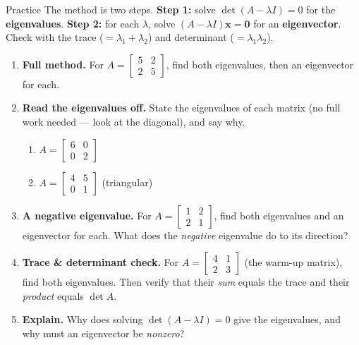 \documentclass[10pt]{article}
\newcommand{\xx}{\mathbf{x}}
\newcommand{\zero}{\mathbf{0}}
\begin{document}
\namedateperiod

\vspace{0.12in}

\begin{notesbox}{Practice}
The method is two steps. \textbf{Step 1:} solve $\det(A-\lambda I)=0$ for the \textbf{eigenvalues}.
\textbf{Step 2:} for each $\lambda$, solve $(A-\lambda I)\xx=\zero$ for an \textbf{eigenvector}. Check
with the trace ($=\lambda_1+\lambda_2$) and determinant ($=\lambda_1\lambda_2$).

\begin{enumerate}[leftmargin=1.9em, itemsep=12pt]
  \item \textbf{Full method.} For $A=\begin{bmatrix} 5 & 2 \\ 2 & 5 \end{bmatrix}$, find both
        eigenvalues, then an eigenvector for each. 
  \item \textbf{Read the eigenvalues off.} State the eigenvalues of each matrix (no full work needed ---
        look at the diagonal), and say why.
    \begin{enumerate}[label=(\alph*), leftmargin=1.8em, itemsep=4pt]
      \item $A=\begin{bmatrix} 6 & 0 \\ 0 & 2 \end{bmatrix}$ \hfill
      \item $A=\begin{bmatrix} 4 & 5 \\ 0 & 1 \end{bmatrix}$ \;(triangular)
    \end{enumerate}
    \vspace{1.0cm}
  \item \textbf{A negative eigenvalue.} For $A=\begin{bmatrix} 1 & 2 \\ 2 & 1 \end{bmatrix}$, find both
        eigenvalues and an eigenvector for each. What does the \emph{negative} eigenvalue do to its
        direction? 
  \item \textbf{Trace \& determinant check.} For $A=\begin{bmatrix} 4 & 1 \\ 2 & 3 \end{bmatrix}$ (the
        warm-up matrix), find both eigenvalues. Then verify that their \emph{sum} equals the trace and
        their \emph{product} equals $\det A$. 
  \item \textbf{Explain.} Why does solving $\det(A-\lambda I)=0$ give the eigenvalues, and why must an
        eigenvector be \emph{nonzero}? 
\end{enumerate}
\end{notesbox}
\end{document}
